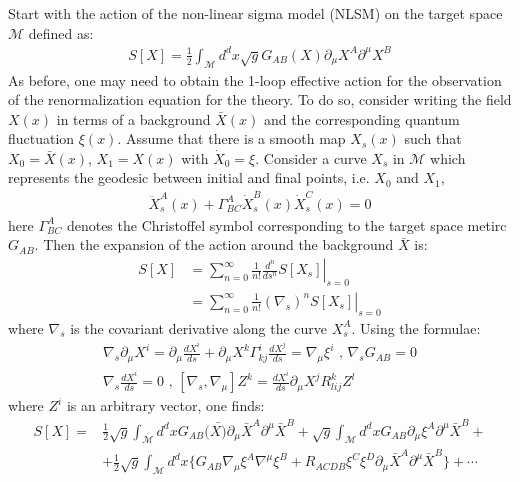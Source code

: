 \documentclass[fleqn]{article}
\begin{document}
Start with the action of the non-linear sigma model (NLSM) on the target space $\mathcal{M}$ defined as:
\begin{align}
S[X] = \frac{1}{2}\int _{\mathcal{M}} d^{d}x \sqrt{g} G_{AB}(X) \partial _{\mu}X^{A} \partial^{\mu} X^{B}
\end{align}
As before, one may need to obtain the 1-loop effective action for the observation of the renormalization equation for the theory. To do so, consider writing the field $X(x)$ in terms of a background $\bar{X}(x)$ and the corresponding quantum fluctuation $\xi(x)$. Assume that there is a smooth map $X_{s}(x)$ such that $X_{0} = \bar X(x)$, $X_{1} = X(x)$ with $\dot{X}_{0}  = \xi$. Consider a curve $X_{s}$ in $\mathcal{M}$ which represents the geodesic between initial and final points, i.e. $X_{0}$ and $X_{1}$, 
\begin{align}
\ddot{X}_{s}^{A} (x) + \Gamma _{BC}^{A}\dot{X}_{s}^{B}(x) \dot{X}_{s}^{C}(x) = 0
\end{align}
here $\Gamma_{BC}^{A}$ denotes the Christoffel symbol corresponding to the target space metirc $G_{AB}$. Then the expansion of the action around the background $\bar{X}$ is:
\begin{align}
S[X] &= \left. \sum _{n=0} ^{\infty} \frac{1}{n!} \frac{d^{n}}{ds ^{n}} S[X_{s}] \right| _{s=0} \nonumber \\
& = \left. \sum _{n=0}^{\infty} \frac{1}{n!} (\nabla _{s})^{n} S[X_{s}] \right| _{s=0}
\end{align} 
where $\nabla _{s}$ is the covariant derivative along the curve $X_{s}^{A}$. Using the formulae:
\begin{align}
\nabla _{s} \partial _{\mu} X^{i} = \partial _{\mu} \frac{dX^{i}}{ds} + \partial _{\mu} X^{k} \Gamma _{kj}^{i} \frac{dX^{j}}{ds} = \nabla _{\mu} \xi ^{i} \text{ , } \nabla_{s} G_{AB} = 0 \nonumber \\
\nabla_{s} \frac{dX^{i}}{ds} = 0 \text{  , } [\nabla _{s}, \nabla _{\mu}] Z^{k} = \frac{dX^{i}}{ds} \partial _{\mu} X^{j} R_{lij}^{k} Z^{l}
\end{align}
where $Z^{i}$ is an arbitrary vector, one finds:
\begin{align}
S[X] = &\frac{1}{2} \sqrt{g} \int _{\mathcal{M}} d^{d}x G_{AB}(\bar{X)} \partial _{\mu} \bar{X}^{A}\partial ^{\mu} \bar{X}^{B} + \sqrt{g} \int _{\mathcal{M}} d^{d}x G_{AB} \partial _{\mu} \xi ^{A} \partial ^{\mu} \bar{X}^{B} + \nonumber \\
& + \frac{1}{2} \sqrt{g} \int _{\mathcal{M}} d^{d} x \lbrace G_{AB} \nabla _{\mu} \xi ^{A} \nabla ^{\mu} \xi^{B}  + R_{ACDB} \xi ^{C} \xi^{D} \partial _{\mu} \bar{X} ^{A} \partial ^{\mu} \bar{X} ^{B} \rbrace + \cdots 
\end{align}
\end{document}
